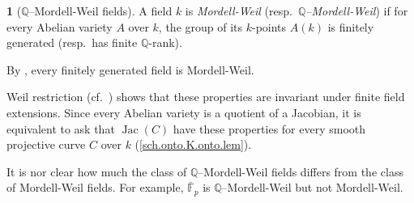 \documentclass{amsart}
\theoremstyle{definition}
\newtheorem{say}[thm]{}
\theoremstyle{remark}
\newcommand{\f}[0]{{\mathbb F}}
\newcommand{\q}[0]{{\mathbb Q}}
\newcommand{\jac}[0]{\operatorname{Jac}}
\begin{document}
\begin{say}[$\q$--Mordell-Weil fields]  \label{m.w.f.defn}
A field $k$ is  {\it Mordell-Weil}  (resp.\ {\it $\q$--Mordell-Weil}) if for every Abelian variety $A$ over $k$, the group of its $k$-points 
$A(k)$ is finitely generated  (resp.\ has finite $\q$-rank). 

By \cite{MR0102520}, every  finitely generated  field is 
Mordell-Weil.

Weil restriction (cf.\ \cite[Sec.7.6]{blr})  shows that these properties are invariant under finite field extensions.
Since every Abelian variety is a quotient of a Jacobian, 
it is equivalent to ask that $\jac(C)$ have these properties  for every smooth projective curve $C$ over $k$ (\ref{sch.onto.K.onto.lem}).

It is nor clear how much the class of $\q$--Mordell-Weil fields differs from the class of Mordell-Weil fields.
For example, $\bar \f_p$ is $\q$--Mordell-Weil but not Mordell-Weil.
\end{say}
\end{document}
